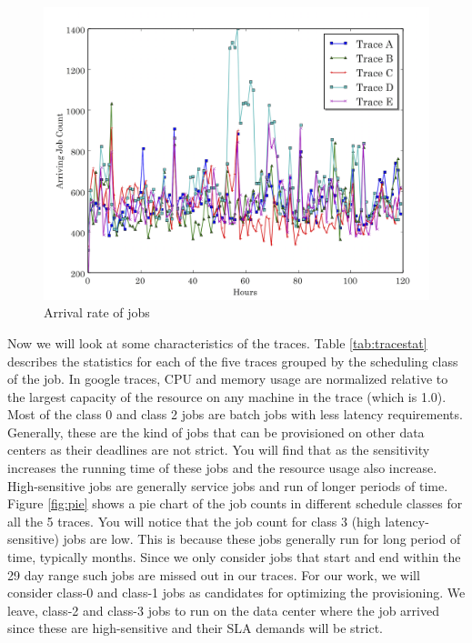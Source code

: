 \documentclass[letterpaper,twocolumn,10pt]{article}
\begin{document}
\begin{figure}[] 
\centering
\includegraphics[scale=0.25]{arrivalrate.png}
\caption{Arrival rate of jobs }
\label{fig:arrivalrate}
\end{figure}

Now we will look at some characteristics of the traces. Table \ref{tab:tracestat} describes the statistics for each of the five traces grouped by the scheduling class of the job. In google traces, CPU and memory usage are normalized relative to the largest capacity of the resource on any machine in the trace (which is 1.0). Most of the class 0 and class 2 jobs are batch jobs with less latency requirements. Generally, these are the kind of jobs that can be provisioned on other data centers as their deadlines are not strict.  You will find that as the sensitivity increases the running time of these jobs and the resource usage also increase. High-sensitive jobs are generally service jobs and run of longer periods of time. Figure \ref{fig:pie} shows a pie chart of the job counts in different schedule classes for all the 5 traces. You will notice that the job count for class 3 (high latency-sensitive) jobs are low. This is because these jobs generally run for long period of time, typically months. Since we only consider jobs that start and end within the 29 day range such jobs are missed out in our traces. For our work, we will consider class-0 and class-1 jobs as candidates for optimizing the provisioning. We leave, class-2 and class-3 jobs to run on the data center where the job arrived since these are high-sensitive and their SLA demands will be strict.
\end{document}
